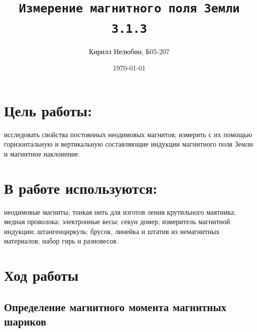 \documentclass[11pt,a4paper]{article}
\title{\texttt{Измерение магнитного поля Земли \\ 3.1.3}}
\author{Кирилл Нелюбин, Б05-207}
\date{\today}
\begin{document}
\maketitle

\section*{Цель работы:}
исследовать свойства постоянных неодимовых магнитов;
измерить с их помощью горизонтальную и вертикальную составляющие
индукции магнитного поля Земли и магнитное наклонение.
\section*{В работе используются:}  
неодимовые магниты; тонкая нить для изготов­
ления крутильного маятника; медная проволока; электронные весы; секун­
домер; измеритель магнитной индукции; штангенциркуль; брусок, линейка
и штатив из немагнитных материалов; набор гирь и разновесов.


\section*{Ход работы}
\subsection*{Определение магнитного момента магнитных шариков}
\end{document}
